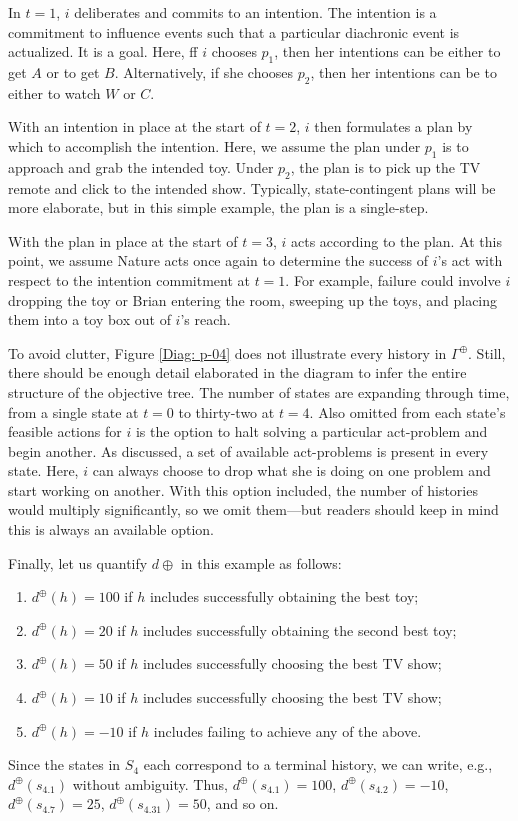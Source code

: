 \documentclass[
11pt,
titlepage,
reqno,
]{article}%
\theoremstyle{definition}
\begin{document}
In $t=1$, $i$ deliberates and commits to an intention. 
The intention is a commitment to influence events such that a particular diachronic event is actualized.
It is a goal. 
Here, ff $i$ chooses $p_1$, then her intentions can be either to get $A$ or to get $B$.
Alternatively, if she chooses $p_2$, then her intentions can be to either to watch $W$ or  $C$.

With an intention in place at the start of $t=2$, $i$ then formulates a plan by which to accomplish the intention. 
Here, we assume the plan under $p_1$ is to approach and grab the intended toy. 
Under  $p_2$, the plan is to pick up the TV remote and click to the intended show.
Typically, state-contingent plans will be more elaborate, but in this simple example, the plan is a single-step.

With the plan in place at the start of $t=3$, $i$ acts according to the plan.
At this point, we assume Nature acts once again to determine the success of $i$'s act with respect to the intention commitment at $t=1$.
For example, failure could involve $i$ dropping the toy or Brian entering the room, sweeping up the toys, and placing them into a toy box out of $i$'s reach.

To avoid clutter, Figure \ref{Diag: p-04} does not illustrate every history in $\Gamma^\oplus$.
Still, there should be enough detail elaborated in the diagram to infer the entire structure of the objective tree.
The number of states are expanding through time, from a single state at $t=0$ to thirty-two at $t=4$.
Also omitted from each state's feasible actions for $i$ is the option to halt solving a particular act-problem and begin another.
As discussed, a set of available act-problems is present in every state.
Here, $i$ can always choose to drop what she is doing on one problem and start working on another.
With this option included, the number of histories would multiply significantly, so we omit them---but readers should keep in mind this is always an available option.

Finally, let us quantify $d\oplus$ in this example as follows:
\begin{enumerate}
	\item $d^\oplus(h)=100$ if $h$ includes successfully obtaining the best toy;
	\item $d^\oplus(h)=20$ if $h$ includes successfully obtaining the second best toy;
	\item $d^\oplus(h)=50$ if $h$ includes successfully choosing the best TV show;
	\item $d^\oplus(h)=10$ if $h$ includes successfully choosing the best TV show;
	\item $d^\oplus(h)=-10$ if $h$ includes failing to achieve any of the above.
\end{enumerate}
Since the states in $S_4$ each correspond to a terminal history, we can write, e.g., $d^\oplus(s_{4.1})$ without ambiguity.
Thus, $d^\oplus(s_{4.1})=100$, $d^\oplus(s_{4.2})=-10$,  $d^\oplus(s_{4.7})=25$, $d^\oplus(s_{4.31})=50$, and so on.
\end{document}
